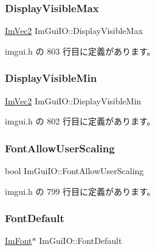 \subsubsection{\texorpdfstring{Display\+Visible\+Max}{DisplayVisibleMax}}
{\footnotesize\ttfamily \mbox{\hyperlink{struct_im_vec2}{Im\+Vec2}} Im\+Gui\+I\+O\+::\+Display\+Visible\+Max}



 imgui.\+h の 803 行目に定義があります。

\mbox{\label{struct_im_gui_i_o_a45b49309f2f8765622962ed7f286674d}} 
\subsubsection{\texorpdfstring{Display\+Visible\+Min}{DisplayVisibleMin}}
{\footnotesize\ttfamily \mbox{\hyperlink{struct_im_vec2}{Im\+Vec2}} Im\+Gui\+I\+O\+::\+Display\+Visible\+Min}



 imgui.\+h の 802 行目に定義があります。

\mbox{\label{struct_im_gui_i_o_af5fc6eae7ce68cce8473f006431f530e}} 
\subsubsection{\texorpdfstring{Font\+Allow\+User\+Scaling}{FontAllowUserScaling}}
{\footnotesize\ttfamily bool Im\+Gui\+I\+O\+::\+Font\+Allow\+User\+Scaling}



 imgui.\+h の 799 行目に定義があります。

\mbox{\label{struct_im_gui_i_o_a11016e4aefa603523bce61315b66bf00}} 
\subsubsection{\texorpdfstring{Font\+Default}{FontDefault}}
{\footnotesize\ttfamily \mbox{\hyperlink{struct_im_font}{Im\+Font}}$\ast$ Im\+Gui\+I\+O\+::\+Font\+Default}



